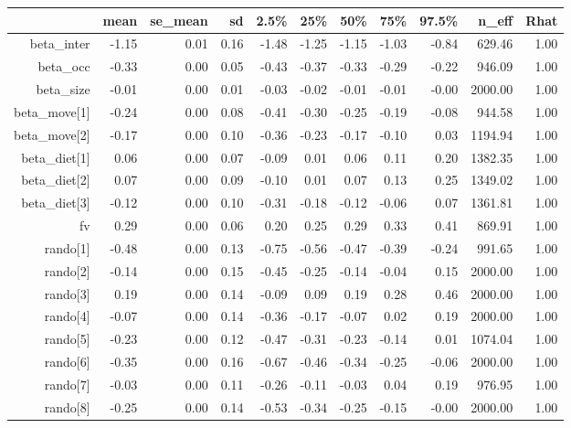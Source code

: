 \begin{table}[ht]
\centering
\begin{tabular}{rrrrrrrrrrr}
  \hline
 & mean & se\_mean & sd & 2.5\% & 25\% & 50\% & 75\% & 97.5\% & n\_eff & Rhat \\ 
  \hline
beta\_inter & -1.15 & 0.01 & 0.16 & -1.48 & -1.25 & -1.15 & -1.03 & -0.84 & 629.46 & 1.00 \\ 
  beta\_occ & -0.33 & 0.00 & 0.05 & -0.43 & -0.37 & -0.33 & -0.29 & -0.22 & 946.09 & 1.00 \\ 
  beta\_size & -0.01 & 0.00 & 0.01 & -0.03 & -0.02 & -0.01 & -0.01 & -0.00 & 2000.00 & 1.00 \\ 
  beta\_move[1] & -0.24 & 0.00 & 0.08 & -0.41 & -0.30 & -0.25 & -0.19 & -0.08 & 944.58 & 1.00 \\ 
  beta\_move[2] & -0.17 & 0.00 & 0.10 & -0.36 & -0.23 & -0.17 & -0.10 & 0.03 & 1194.94 & 1.00 \\ 
  beta\_diet[1] & 0.06 & 0.00 & 0.07 & -0.09 & 0.01 & 0.06 & 0.11 & 0.20 & 1382.35 & 1.00 \\ 
  beta\_diet[2] & 0.07 & 0.00 & 0.09 & -0.10 & 0.01 & 0.07 & 0.13 & 0.25 & 1349.02 & 1.00 \\ 
  beta\_diet[3] & -0.12 & 0.00 & 0.10 & -0.31 & -0.18 & -0.12 & -0.06 & 0.07 & 1361.81 & 1.00 \\ 
  fv & 0.29 & 0.00 & 0.06 & 0.20 & 0.25 & 0.29 & 0.33 & 0.41 & 869.91 & 1.00 \\ 
  rando[1] & -0.48 & 0.00 & 0.13 & -0.75 & -0.56 & -0.47 & -0.39 & -0.24 & 991.65 & 1.00 \\ 
  rando[2] & -0.14 & 0.00 & 0.15 & -0.45 & -0.25 & -0.14 & -0.04 & 0.15 & 2000.00 & 1.00 \\ 
  rando[3] & 0.19 & 0.00 & 0.14 & -0.09 & 0.09 & 0.19 & 0.28 & 0.46 & 2000.00 & 1.00 \\ 
  rando[4] & -0.07 & 0.00 & 0.14 & -0.36 & -0.17 & -0.07 & 0.02 & 0.19 & 2000.00 & 1.00 \\ 
  rando[5] & -0.23 & 0.00 & 0.12 & -0.47 & -0.31 & -0.23 & -0.14 & 0.01 & 1074.04 & 1.00 \\ 
  rando[6] & -0.35 & 0.00 & 0.16 & -0.67 & -0.46 & -0.34 & -0.25 & -0.06 & 2000.00 & 1.00 \\ 
  rando[7] & -0.03 & 0.00 & 0.11 & -0.26 & -0.11 & -0.03 & 0.04 & 0.19 & 976.95 & 1.00 \\ 
  rando[8] & -0.25 & 0.00 & 0.14 & -0.53 & -0.34 & -0.25 & -0.15 & -0.00 & 2000.00 & 1.00 \\ 

\end{tabular}
\end{table}
